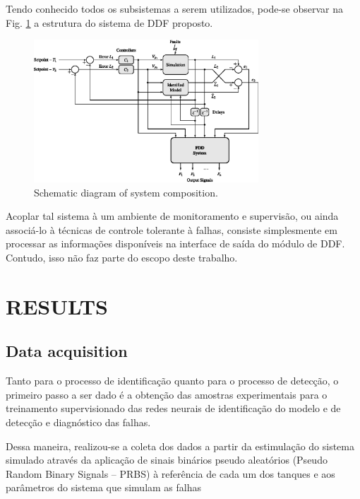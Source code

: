 \documentclass[10pt,fleqn,a4paper]{article}
\begin{document}
Tendo conhecido todos os subsistemas a serem utilizados, pode-se observar na
Fig. \ref{fig:comp} a estrutura do sistema de DDF proposto.

\begin{figure}[htb]
\centering
    \includegraphics[width=0.75\textwidth]{imgs/comp}
    \caption{Schematic diagram of system composition.}
    \label{fig:comp}
\end{figure}

Acoplar tal sistema à um ambiente de monitoramento e supervisão, ou ainda
associá-lo à técnicas de controle tolerante à falhas, consiste simplesmente em
processar as informações disponíveis na interface de saída do módulo de DDF.
Contudo, isso não faz parte do escopo deste trabalho.

\section{RESULTS}\label{sec:results}

\subsection{Data acquisition}
Tanto para o processo de identificação quanto para o processo de detecção, o
primeiro passo a ser dado é a obtenção das amostras experimentais para o
treinamento supervisionado das redes neurais de identificação do modelo e de
detecção e diagnóstico das falhas.

Dessa maneira, realizou-se a coleta dos dados a partir da estimulação do sistema
simulado através da aplicação de sinais binários pseudo aleatórios (Pseudo
Random Binary Signals -- PRBS) à referência de cada um dos tanques e aos
parâmetros do sistema que simulam as falhas
\end{document}
